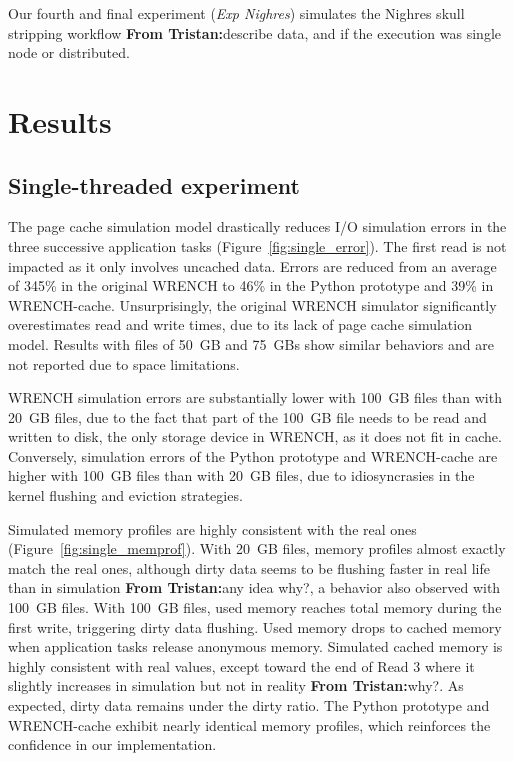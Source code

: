 \documentclass[conference]{IEEEtran}
\newcommand{\tristan}[1]{\color{orange}\textbf{From Tristan:}#1\color{black}}
\newcommand{\wrench}{WRENCH\xspace}
\begin{document}
            Our fourth and final experiment (\textit{Exp Nighres})
            simulates the Nighres skull stripping workflow
            \tristan{describe data, and if the execution was single node or
            distributed.}

    \section{Results}
    \label{results}

        \subsection{Single-threaded experiment}

        The page cache simulation model drastically reduces I/O simulation
        errors in the three successive application tasks (Figure~\ref{fig:single_error}). The first read is not impacted
        as it only involves uncached data. Errors are reduced from an average
        of 345\% in the original \wrench to 46\% in the Python prototype and
        39\% in \wrench-cache. Unsurprisingly, the original \wrench simulator
        significantly overestimates read and write times, due to its lack
        of page cache simulation model. Results with files of 50~GB and 75~GBs
        show similar behaviors and are not reported due to space limitations.

        \wrench simulation errors are substantially lower with 100~GB
        files than with 20~GB files, due to the fact that part of the
        100~GB file needs to be read and written to disk, the only storage
        device in \wrench, as it does not fit in cache. Conversely,
        simulation errors of the Python prototype and \wrench-cache are higher with
        100~GB files than with 20~GB files, due to idiosyncrasies in the kernel
        flushing and eviction strategies.

        Simulated memory profiles are highly consistent with the real ones
        (Figure~\ref{fig:single_memprof}). With 20~GB files, memory
        profiles almost exactly match the real ones, although dirty data
        seems to be flushing faster in real life than in simulation
        \tristan{any idea why?}, a behavior also observed with 100~GB files. With
        100~GB files, used memory reaches total memory during the first write,
        triggering dirty data flushing. Used memory drops to cached memory
        when application tasks release anonymous memory. Simulated cached
        memory is highly consistent with real values, except toward the end
        of Read 3 where it slightly increases in simulation but not in
        reality \tristan{why?}. As expected, dirty data remains under the
        dirty ratio. The Python prototype and \wrench-cache exhibit nearly
        identical memory profiles, which reinforces the confidence in our
        implementation.
\end{document}
